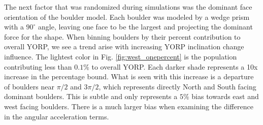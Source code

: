 The next factor that was randomized during simulations was the dominant face orientation of the boulder model. Each boulder was modeled by a wedge prism with a $90^{\circ}$ angle, leaving one face to be the largest and projecting the dominant force for the shape. When binning boulders by their percent contribution to overall YORP, we see a trend arise with increasing YORP inclination change influence. The lightest color in Fig. \ref{fig:west_onepercent} is the population contributing less than $0.1\%$ to overall YORP. Each darker shade represents a 10x increase in the percentage bound. What is seen with this increase is a departure of boulders near $\pi/2$ and $3\pi/2$, which represents directly North and South facing dominant boulders. This is subtle and only represents a $5\%$ bias towards east and west facing boulders. There is a much larger bias when examining the difference in the angular acceleration terms. %

